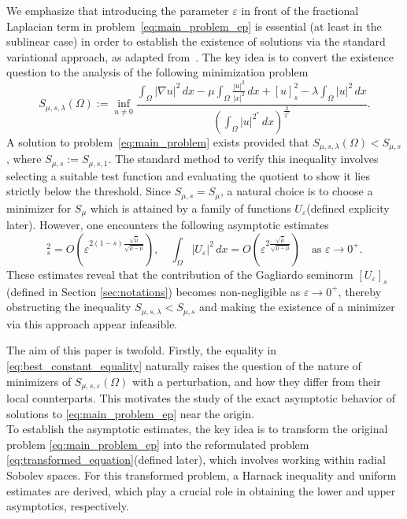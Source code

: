 \documentclass[11pt]{article}
\begin{document}
We emphasize that introducing the parameter \( \varepsilon \) in front of the fractional Laplacian term in problem~\eqref{eq:main_problem_ep} is essential (at least in the sublinear case) in order to establish the existence of solutions via the standard variational approach, as adapted from~\cite{brezis_1983}. The key idea is to convert the existence question to the analysis of the following minimization problem
\begin{equation*} 
S_{\mu, s,\lambda}(\Omega) := \inf_{u \neq 0} 
\frac{\displaystyle\int_{\Omega} |\nabla u|^2 \, dx - \mu \int_{\Omega} \frac{|u|^2}{|x|^2} \, dx +  [u]_{s}^2 - \lambda \int_{\Omega} |u|^2 \, dx}
{\left(\displaystyle\int_{\Omega} |u|^{2^*} \, dx \right)^{\frac{2}{2^*}}}.
\end{equation*}
A solution to problem~\eqref{eq:main_problem} exists provided that $S_{\mu, s,\lambda}(\Omega) < S_{\mu, s}$, where $ S_{\mu, s}:=S_{\mu, s,1}$. The standard method to verify this inequality involves selecting a suitable test function and evaluating the quotient to show it lies strictly below the threshold. Since \( S_{\mu, s} = S_\mu \), a natural choice is to choose a minimizer for $S_{\mu}$ which is attained by a family of functions \( U_{\varepsilon} \)(defined explicity later). However, one encounters the following asymptotic estimates
\begin{equation*}
    [U_{\varepsilon}]_s^2 = O\left(\varepsilon^{2(1-s)\frac{\sqrt{\bar\mu}}{\sqrt{\bar\mu - \mu}}}\right), \quad 
    \int_{\Omega} |U_{\varepsilon}|^2 \, dx = O\left(\varepsilon^{2\frac{\sqrt{\bar\mu}}{\sqrt{\bar\mu - \mu}}}\right) 
    \quad \text{as } \varepsilon \to 0^+.
\end{equation*}
These estimates reveal that the contribution of the Gagliardo seminorm $[U_{\varepsilon}]_s$ (defined in Section \ref{sec:notations}) becomes non-negligible as \( \varepsilon \to 0^+ \), thereby obstructing the inequality \( S_{\mu, s,\lambda} < S_{\mu, s} \) and making the existence of a minimizer via this approach appear infeasible.


The aim of this paper is twofold. Firstly, the equality in \eqref{eq:best_constant_equality} naturally raises the question of the nature of minimizers of \(S_{\mu, s, \varepsilon}(\Omega)\) with a perturbation, and how they differ from their local counterparts. This motivates the study of the exact asymptotic behavior of solutions to \eqref{eq:main_problem_ep} near the origin.\\
To establish the asymptotic estimates, the key idea is to transform the original problem \eqref{eq:main_problem_ep} into the reformulated problem \eqref{eq:transformed_equation}(defined later), which involves working within radial Sobolev spaces. For this transformed problem, a Harnack inequality and uniform estimates are derived, which play a crucial role in obtaining the lower and upper asymptotics, respectively.
\end{document}
